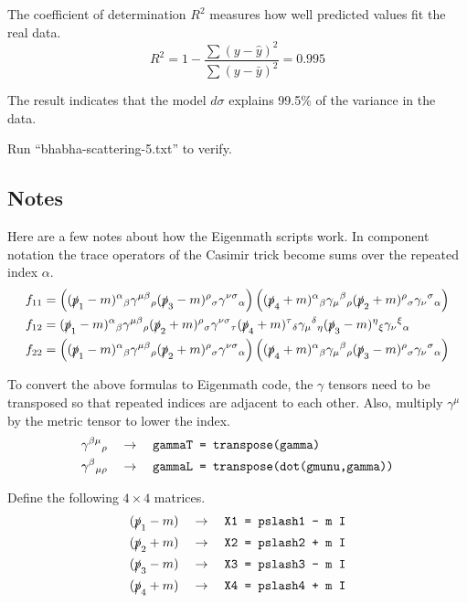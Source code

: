 \documentclass[12pt]{article}
\begin{document}
\noindent
The coefficient of determination $R^2$ measures how well predicted values fit the real data.
\begin{equation*}
R^2=1-\frac{\sum(y-\hat{y})^2}{\sum(y-\bar{y})^2}=0.995
\end{equation*}

\noindent
The result indicates that the model $d\sigma$ explains 99.5\% of the variance in the data.

\bigskip
\noindent
Run ``bhabha-scattering-5.txt'' to verify.

\subsection*{Notes}
Here are a few notes about how the Eigenmath scripts work.
In component notation the trace operators of the Casimir trick become sums over the repeated index $\alpha$.
\begin{align*}
f_{11}&=
\left(
(\slashed{p}_1-m)^\alpha{}_\beta
\gamma^{\mu\beta}{}_\rho
(\slashed{p}_3-m)^\rho{}_\sigma
\gamma^{\nu\sigma}{}_\alpha
\right)
\left(
(\slashed{p}_4+m)^\alpha{}_\beta
\gamma_\mu{}^\beta{}_\rho
(\slashed{p}_2+m)^\rho{}_\sigma
\gamma_\nu{}^\sigma{}_\alpha
\right)
\\
f_{12}&=
(\slashed{p}_1-m)^\alpha{}_\beta
\gamma^{\mu\beta}{}_\rho
(\slashed{p}_2+m)^\rho{}_\sigma
\gamma^{\nu\sigma}{}_\tau
(\slashed{p}_4+m)^\tau{}_\delta
\gamma_\mu{}^\delta{}_\eta
(\slashed{p}_3-m)^\eta{}_\xi
\gamma_\nu{}^\xi{}_\alpha
\\
f_{22}&=
\left(
(\slashed{p}_1-m)^\alpha{}_\beta
\gamma^{\mu\beta}{}_\rho
(\slashed{p}_2+m)^\rho{}_\sigma
\gamma^{\nu\sigma}{}_\alpha
\right)
\left(
(\slashed{p}_4+m)^\alpha{}_\beta
\gamma_\mu{}^\beta{}_\rho
(\slashed{p}_3-m)^\rho{}_\sigma
\gamma_\nu{}^\sigma{}_\alpha
\right)
\end{align*}

\noindent
To convert the above formulas to Eigenmath code,
the $\gamma$ tensors need to be transposed
so that repeated indices are adjacent to each other.
Also, multiply $\gamma^\mu$ by the metric tensor to lower the index.
\begin{align*}
\gamma^{\beta\mu}{}_\rho\quad&\rightarrow\quad
\text{\tt gammaT = transpose(gamma)}\\
\gamma^\beta{}_{\mu\rho}\quad&\rightarrow\quad
\text{\tt gammaL = transpose(dot(gmunu,gamma))}
\end{align*}

\noindent
Define the following $4\times4$ matrices.
\begin{align*}
(\slashed{p}_1-m)\quad&\rightarrow\quad\text{\tt X1 = pslash1 - m I}\\
(\slashed{p}_2+m)\quad&\rightarrow\quad\text{\tt X2 = pslash2 + m I}\\
(\slashed{p}_3-m)\quad&\rightarrow\quad\text{\tt X3 = pslash3 - m I}\\
(\slashed{p}_4+m)\quad&\rightarrow\quad\text{\tt X4 = pslash4 + m I}
\end{align*}
\end{document}
